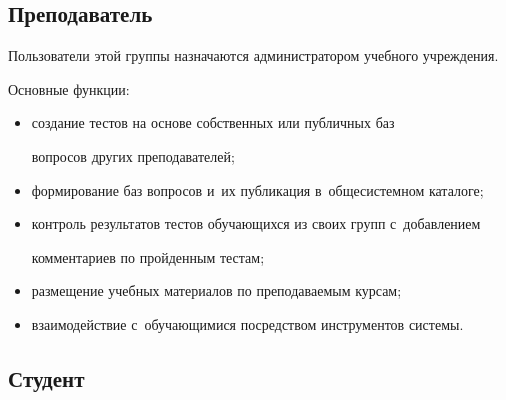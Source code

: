 \vspace*{-3pt}





\subsection{Преподаватель}





\vspace*{-3pt}





Пользователи этой группы назначаются администратором учебного учреждения. 


Основные функции:


\begin{itemize}


\item создание тестов на основе собственных или публичных баз 


вопросов других преподавателей;\\[-15pt]


\item формирование баз вопросов и~их публикация в~общесистемном каталоге;\\[-15pt]


\item контроль результатов тестов обучающихся из своих групп с~добавлением 


комментариев по пройденным тестам;\\[-15pt]


\item размещение учебных материалов по преподаваемым курсам;\\[-15pt]


\item взаимодействие с~обучающимися посредством инструментов системы.


\end{itemize}





\vspace*{-3pt}





\subsection{Студент}





